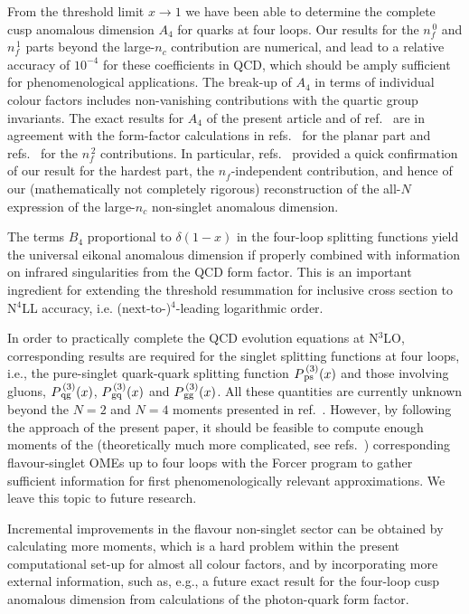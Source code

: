 \documentclass[12pt]{article}
\def\nc{{n_c}}
\def\nf{{n^{}_{\! f}}}
\def\nfz{{n^{\,0}_{\! f}}}
\def\nfo{{n^{\,1}_{\! f}}}
\def\nfs{{n^{\,2}_{\! f}}}
\def\xm1{{(1 \! - \! x)}}
\begin{document}
From the threshold limit $x \!\to\! 1$ we have been able to determine the 
complete cusp anomalous dimension $A_4$ for quarks at four loops.  Our results 
for the $\nfz$ and $\nfo$ parts beyond the \mbox{large-$\nc$} contribution
are numerical, and lead to a relative accuracy of $10^{-4}$ for these 
coefficients in QCD, which should be amply sufficient for phenomenological 
applications. The break-up of $A_4$ in terms of individual colour factors 
includes non-vanishing contributions with the quartic group invariants.
%
The exact results for $A_4$ of the present article and of 
ref.~\cite{Davies:2016jie} are in agreement with the form-factor calculations
in refs.~\cite{Henn:2016men,Lee:2016ixa} for the planar part and 
refs.~\cite{Grozin:2016ydd,Lee:2017mip} for the $\nfs$ contributions.
In particular, refs.~\cite{Lee:2016ixa} provided a quick confirmation of our
result for the hardest part, the $\nf$-independent contribution, and hence
of our (mathematically not completely rigorous) reconstruction of the all-$N$ 
expression of the large-$\nc$ non-singlet anomalous dimension.

The terms $B_4$ proportional to $\delta\xm1$ in the four-loop splitting
functions yield the universal eikonal anomalous dimension if properly combined
with information on infrared singularities from the QCD form factor. 
This is an important ingredient for extending the threshold resummation for
inclusive cross section to N$^4$LL accuracy, i.e. (next-to-)$^4$-leading 
logarithmic order.

\bigskip

In order to practically complete the QCD evolution equations at N$^3$LO, 
corresponding results are required for the singlet splitting functions at 
four loops, i.e., the pure-singlet quark-quark splitting function 
$P_{\,\rm ps}^{\,(3)}(x)$ and those involving gluons, 
$P_{\,\rm qg}^{\,(3)}(x)$, $P_{\,\rm gq}^{\,(3)}(x)$ and 
$P_{\,\rm gg}^{\,(3)}(x)$. All these quantities are currently unknown beyond 
the $N=2$ and $N=4$ moments presented in ref.~\cite{Ruijl:2016pkm}.
%
However, by following the approach of the present paper, it should be feasible 
to compute enough moments of the (theoretically much more complicated, see 
refs.~\cite{Hamberg:1991qt,Collins:1994ee}) corresponding flavour-singlet OMEs 
up to four loops with the {\sc Forcer} program to gather sufficient information
for first phenomenologically relevant approximations. 
We leave this topic to future research.

Incremental improvements in the flavour non-singlet sector can be obtained by 
calculating more moments, which is a hard problem within the present 
computational set-up for almost all colour factors, and by incorporating more 
external information, such as, e.g., a future exact result for the four-loop 
cusp anomalous dimension from calculations of the photon-quark form factor. 
\end{document}
